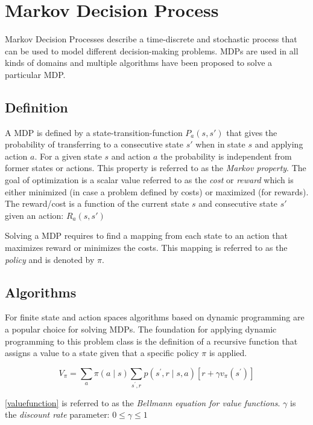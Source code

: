 \chapter{Markov Decision Process}

Markov Decision Processes describe a time-discrete and stochastic process that can be used to model different decision-making problems. MDPs are used in all kinds of domains and multiple algorithms have been proposed to solve a particular MDP. 

\section{Definition}

A MDP is defined by a state-transition-function $P_a(s,s')$ that gives the probability of transferring to a consecutive state $s'$ when in state $s$ and applying action $a$. For a given state $s$ and action $a$ the probability is independent from former states or actions. This property is referred to as the \emph{Markov property}. The goal of optimization is a scalar value referred to as the \emph{cost} or \emph{reward} which is either minimized (in case a problem defined by costs) or maximized (for rewards). The reward/cost is a function of the current state $s$ and consecutive state $s'$ given an action: $R_a(s,s')$

Solving a MDP requires to find a mapping from each state to an action that maximizes reward or minimizes the costs. This mapping is referred to as the \emph{policy} and is denoted by $\pi$. 

\section{Algorithms}

For finite state and action spaces algorithms based on dynamic programming are a popular choice for solving MDPs. 
The foundation for applying dynamic programming to this problem class is the definition of a recursive function that assigns a value to a state given that a specific policy $\pi$ is applied.  

\begin{equation}
V_\pi = \sum_{a} \pi(a \mid s) \sum_{s^{\prime}, r} p\left(s^{\prime}, r \mid s, a\right)\left[r+\gamma v_{\pi}\left(s^{\prime}\right)\right]
\label{valuefunction}
\end{equation}

\autoref{valuefunction} is referred to as the \emph{Bellmann equation for value functions}. $\gamma$ is the \emph{discount rate} parameter: $0\leq\gamma\leq1$ 

